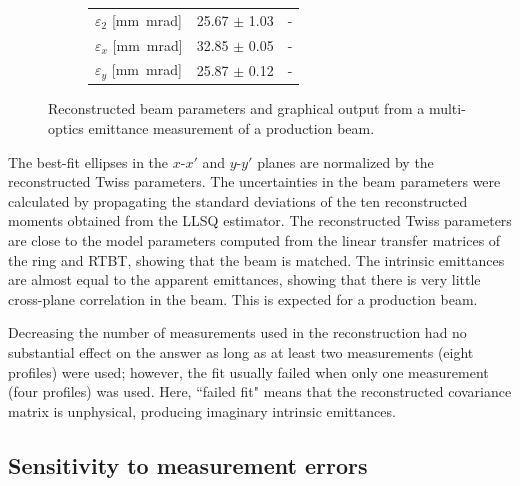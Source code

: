 \begin{figure}[!p]
\begin{subfigure}{0.6\textwidth}
\begin{tabular}{lcc}
            \small$\varepsilon_2$ [mm~mrad] & \small25.67 $\pm$ \small1.03 & - \\
            \small$\varepsilon_x$ [mm~mrad] & \small32.85 $\pm$ \small0.05 & - \\
            \small$\varepsilon_y$ [mm~mrad] & \small25.87 $\pm$ \small0.12 & - \\
          \end{tabular}
    \end{subfigure}
    \par\medskip
    \caption{Reconstructed beam parameters and graphical output from a multi-optics emittance measurement of a production beam.}
    \label{fig:prod_meas}
\end{figure}
%
The best-fit ellipses in the $x$-$x'$ and $y$-$y'$ planes are normalized by the reconstructed Twiss parameters. The uncertainties in the beam parameters were calculated by propagating the standard deviations of the ten reconstructed moments obtained from the LLSQ estimator. The reconstructed Twiss parameters are close to the model parameters computed from the linear transfer matrices of the ring and RTBT, showing that the beam is matched. The intrinsic emittances are almost equal to the apparent emittances, showing that there is very little cross-plane correlation in the beam. This is expected for a production beam.

Decreasing the number of measurements used in the reconstruction had no substantial effect on the answer as long as at least two measurements (eight profiles) were used; however, the fit usually failed when only one measurement (four profiles) was used. Here, ``failed fit" means that the reconstructed covariance matrix is unphysical, producing imaginary intrinsic emittances. 



\subsection{Sensitivity to measurement errors}

